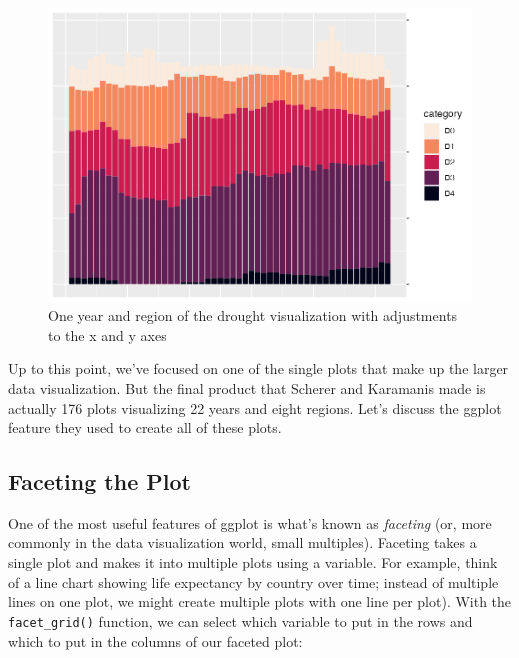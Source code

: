 \documentclass[
]{book}
\begin{document}
\begin{figure}
\includegraphics[width=1\linewidth]{data-viz_files/figure-latex/southwest-2003-xy-scales-plot-1} \caption{One year and region of the drought visualization with adjustments to the x and y axes}\label{fig:southwest-2003-xy-scales-plot}
\end{figure}

Up to this point, we've focused on one of the single plots that make up the larger data visualization. But the final product that Scherer and Karamanis made is actually 176 plots visualizing 22 years and eight regions. Let's discuss the ggplot feature they used to create all of these plots.

\hypertarget{faceting-the-plot}{%
\subsection*{Faceting the Plot}\label{faceting-the-plot}}

One of the most useful features of ggplot is what's known as \emph{faceting} (or, more commonly in the data visualization world, small multiples). Faceting takes a single plot and makes it into multiple plots using a variable. For example, think of a line chart showing life expectancy by country over time; instead of multiple lines on one plot, we might create multiple plots with one line per plot). With the \texttt{facet\_grid()} function, we can select which variable to put in the rows and which to put in the columns of our faceted plot:
\end{document}
